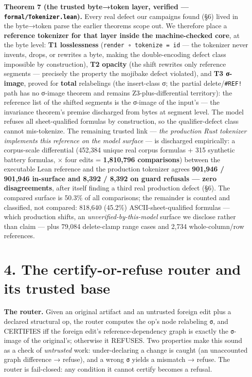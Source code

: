 \documentclass[
  11pt,
]{article}
\begin{document}
\textbf{Theorem 7 (the trusted byte→token layer, verified ---
\texttt{formal/Tokenizer.lean}).} Every real defect our campaigns found
(§6) lived in the byte→token parse the earlier theorems scope out. We
therefore place a \textbf{reference tokenizer for that layer inside the
machine-checked core}, at the byte level: \textbf{T1 losslessness}
(\texttt{render\ ∘\ tokenize\ =\ id} --- the tokenizer never invents,
drops, or rewrites a byte, making the double-encoding defect class
impossible by construction), \textbf{T2 opacity} (the shift rewrites
only reference segments --- precisely the property the mojibake defect
violated), and \textbf{T3 σ-image}, proved for \textbf{total}
relabelings (the insert-class σ; the partial delete/\texttt{\#REF!} path
has no σ-image theorem and remains Z3-plus-differential territory): the
reference list of the shifted segments is the σ-image of the input's ---
the invariance theorem's premise discharged from bytes at segment level.
The model refuses all sheet-qualified formulas by construction, so the
qualifier-defect class cannot mis-tokenize. The remaining trusted link
--- \emph{the production Rust tokenizer implements this reference on the
model surface} --- is discharged empirically: a corpus-scale
differential (452,384 unique real corpus formulas + 315 synthetic
battery formulas, × four edits = \textbf{1,810,796 comparisons}) between
the executable Lean reference and the production tokenizer agrees
\textbf{901,946 / 901,946 in-surface and 8,392 / 8,392 on guard refusals
--- zero disagreements}, after itself finding a third real production
defect (§6). The compared surface is 50.3\% of all comparisons; the
remainder is counted and classified, not compared: 818,640 (45.2\%)
ASCII-sheet-qualified formulas --- which production shifts, an
\emph{unverified-by-this-model} surface we disclose rather than claim
--- plus 79,084 delete-clamp range cases and 2,734 whole-column/row
references.

\section{4. The certify-or-refuse router and its trusted
base}\label{the-certify-or-refuse-router-and-its-trusted-base}

\textbf{The router.} Given an original artifact and an untrusted foreign
edit plus a declared structural op, the router computes the op's node
relabeling \texttt{σ}, and CERTIFIES iff the foreign edit's
reference-dependency graph is exactly the \texttt{σ}-image of the
original's; otherwise it REFUSES. Two properties make this sound as a
check of \emph{untrusted} work: under-declaring a change is caught (an
unaccounted graph difference → refuse), and a wrong \texttt{σ} yields a
mismatch → refuse. The router is fail-closed: any condition it cannot
certify becomes a refusal.
\end{document}
